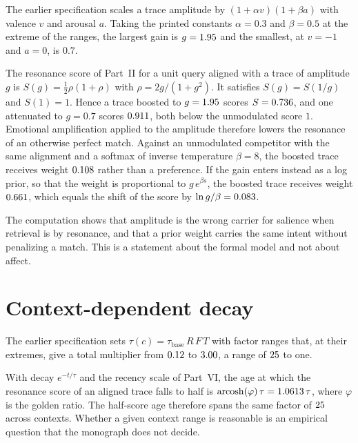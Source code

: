 The earlier specification scales a trace amplitude by $(1+\alpha v)(1+\beta a)$ with valence $v$ and arousal $a$. Taking the printed constants $\alpha=0.3$ and $\beta=0.5$ at the extreme of the ranges, the largest gain is $g=1.95{}$ and the smallest, at $v=-1$ and $a=0$, is $0.7$.

\begin{workedex}\label{ex:emotion-prior}
The resonance score of Part~II for a unit query aligned with a trace of amplitude $g$ is $S(g)=\tfrac12\rho(1+\rho)$ with $\rho=2g/(1+g^2)$. It satisfies $S(g)=S(1/g)$ and $S(1)=1$. Hence a trace boosted to $g=1.95{}$ scores $S=0.736{}$, and one attenuated to $g=0.7$ scores $0.911{}$, both below the unmodulated score $1$. Emotional amplification applied to the amplitude therefore lowers the resonance of an otherwise perfect match. Against an unmodulated competitor with the same alignment and a softmax of inverse temperature $\beta=8$, the boosted trace receives weight $0.108{}$ rather than a preference. If the gain enters instead as a log prior, so that the weight is proportional to $g\,e^{\beta s}$, the boosted trace receives weight $0.661{}$, which equals the shift of the score by $\ln g/\beta=0.083{}$.
\end{workedex}

The computation shows that amplitude is the wrong carrier for salience when retrieval is by resonance, and that a prior weight carries the same intent without penalizing a match. This is a statement about the formal model and not about affect.

\section{Context-dependent decay}\label{sec:july-decay}

The earlier specification sets $\tau(c)=\tau_{\mathrm{base}}\,R\,F\,T$ with factor ranges that, at their extremes, give a total multiplier from $0.12{}$ to $3.00{}$, a range of $25{}$ to one.

\begin{extension}\label{ext:tau-range}
With decay $e^{-t/\tau}$ and the recency scale of Part~VI, the age at which the resonance score of an aligned trace falls to half is $\operatorname{arcosh}(\varphi)\,\tau=1.0613{}\,\tau$, where $\varphi$ is the golden ratio. The half-score age therefore spans the same factor of $25{}$ across contexts. Whether a given context range is reasonable is an empirical question that the monograph does not decide.
\end{extension}

